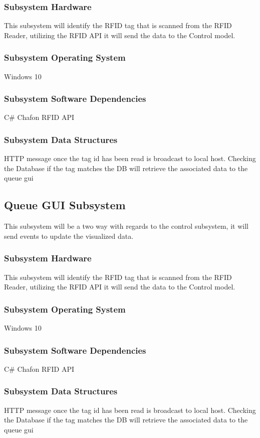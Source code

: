\subsubsection{Subsystem Hardware}
This subsystem will identify the RFID tag that is scanned from the RFID Reader, utilizing the RFID
API it will send the data to the Control model.

\subsubsection{Subsystem Operating System}
Windows 10

\subsubsection{Subsystem Software Dependencies}
C\# Chafon RFID API


\subsubsection{Subsystem Data Structures}
HTTP message once the tag id has been read is broadcast to local host. Checking the Database if the tag matches the DB will retrieve the associated data to the queue gui 

\subsection{Queue GUI Subsystem}
This subsystem will be a two way with regards to the control subsystem, it will send events to
update the visualized data.

\subsubsection{Subsystem Hardware}
This subsystem will identify the RFID tag that is scanned from the RFID Reader, utilizing the RFID
API it will send the data to the Control model.

\subsubsection{Subsystem Operating System}
Windows 10

\subsubsection{Subsystem Software Dependencies}
C\# Chafon RFID API


\subsubsection{Subsystem Data Structures}
HTTP message once the tag id has been read is broadcast to local host. Checking the Database if the tag matches the DB will retrieve the associated data to the queue gui 

